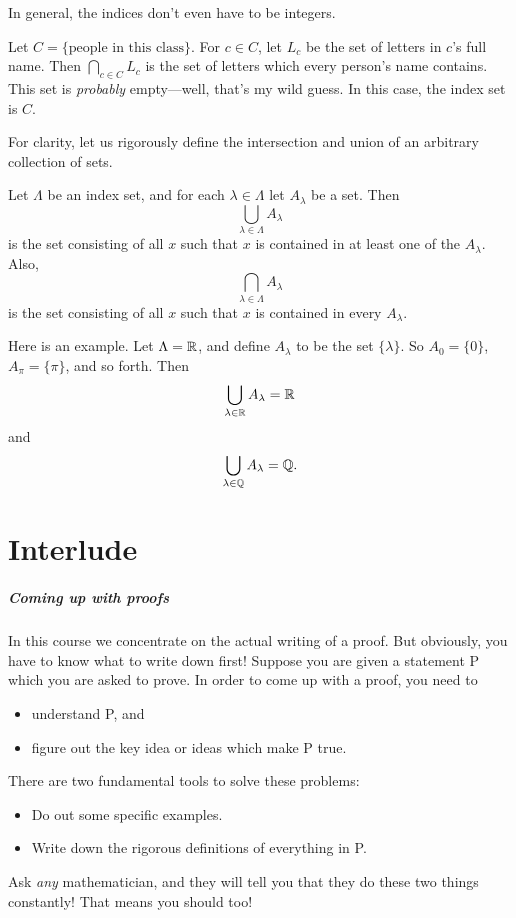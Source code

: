 \documentclass{tufte-book}
\begin{document}
In general, the indices don't even have to be integers.
\begin{example}
  Let $C = \{\text{people in this class}\}$. For $c \in C$, let $L_c$ be the set of letters in $c$'s full name. Then $\displaystyle\bigcap_{c \in C} L_c$ is the set of letters which every person's name contains. This set is \emph{probably} empty---well, that's my wild guess. In this case, the index set is $C$.
\end{example}

For clarity, let us rigorously define the intersection and union of an arbitrary collection of sets.
\begin{definition}
  Let $\Lambda$ be an index set, and for each $\lambda \in \Lambda$ let $A_\lambda$ be a set. Then
  \[
  \bigcup_{\lambda \in \Lambda} A_\lambda
  \]
  is the set consisting of all $x$ such that $x$ is contained in at least one of the $A_\lambda$. Also,
  \[
  \bigcap_{\lambda \in \Lambda} A_\lambda
  \]
  is the set consisting of all $x$ such that $x$ is contained in every $A_\lambda$.
\end{definition}
Here is an example. Let $\Lambda = \mathbb{R}$, and define $A_\lambda$ to be the set $\{\lambda\}$. So $A_0 = \{0\}$, $A_\pi = \{\pi\}$, and so forth. Then
\[
\bigcup_{\lambda \in \mathbb{R}} A_\lambda = \mathbb{R}
\]
and
\[
\bigcup_{\lambda \in \mathbb{Q}} A_\lambda = \mathbb{Q}.
\]




\chapter*{Interlude}
\label{cha:interlude}


\paragraph{Coming up with proofs}
\label{sec:coming-up-with}

In this course we concentrate on the actual writing of a proof. But obviously, you have to know what to write down first! Suppose you are given a statement P which you are asked to prove. In order to come up with a proof, you need to
\begin{itemize}
    \item understand P, and
    \item figure out the key idea or ideas which make P true.
\end{itemize}
There are two fundamental tools to solve these problems:
\begin{itemize}
    \item Do out some specific examples. 
    \item Write down the rigorous definitions of everything in P. 
\end{itemize}
Ask \emph{any} mathematician, and they will tell you that they do these two things constantly! That means you should too!
\end{document}
